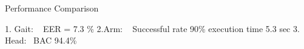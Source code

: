 Performance Comparison

1. Gait: ~\cite{gafurov2006biometric} EER  = 7.3 \%
2.Arm: ~\cite{ahmed2015checksum} Successful rate 90\% execution time 5.3 sec
3. Head:~\cite{rogers2015approach} BAC 94.4\%

